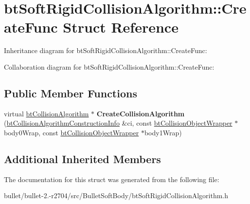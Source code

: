 \hypertarget{structbt_soft_rigid_collision_algorithm_1_1_create_func}{\section{bt\+Soft\+Rigid\+Collision\+Algorithm\+:\+:Create\+Func Struct Reference}
\label{structbt_soft_rigid_collision_algorithm_1_1_create_func}
}


Inheritance diagram for bt\+Soft\+Rigid\+Collision\+Algorithm\+:\+:Create\+Func\+:


Collaboration diagram for bt\+Soft\+Rigid\+Collision\+Algorithm\+:\+:Create\+Func\+:
\subsection*{Public Member Functions}
\begin{DoxyCompactItemize}
\item 
\hypertarget{structbt_soft_rigid_collision_algorithm_1_1_create_func_acab3c43a01b1fa470daa832a03d0afb4}{virtual \hyperlink{classbt_collision_algorithm}{bt\+Collision\+Algorithm} $\ast$ {\bfseries Create\+Collision\+Algorithm} (\hyperlink{structbt_collision_algorithm_construction_info}{bt\+Collision\+Algorithm\+Construction\+Info} \&ci, const \hyperlink{structbt_collision_object_wrapper}{bt\+Collision\+Object\+Wrapper} $\ast$body0\+Wrap, const \hyperlink{structbt_collision_object_wrapper}{bt\+Collision\+Object\+Wrapper} $\ast$body1\+Wrap)}\label{structbt_soft_rigid_collision_algorithm_1_1_create_func_acab3c43a01b1fa470daa832a03d0afb4}

\end{DoxyCompactItemize}
\subsection*{Additional Inherited Members}


The documentation for this struct was generated from the following file\+:\begin{DoxyCompactItemize}
\item 
bullet/bullet-\/2.-\/r2704/src/\+Bullet\+Soft\+Body/bt\+Soft\+Rigid\+Collision\+Algorithm.\+h\end{DoxyCompactItemize}
